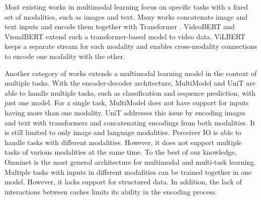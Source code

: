 \documentclass{article}
\begin{document}


Most existing works in multimodal learning focus on specific tasks with a fixed set of modalities, such as images and text. Many works concatenate image and text inputs and encode them together with Transformer \cite{chen2020uniter,li2020unicoder}. VideoBERT \cite{sun2019videobert} and VisualBERT \cite{li2019visualbert} extend such a transformer-based model to video data. ViLBERT \cite{lu2019vilbert} keeps a separate stream for each modality and enables cross-modality connections to encode one modality with the other. 

Another category of works extends a multimodal learning model in the context of multiple tasks. With the encoder-decoder architecture, MultiModel \cite{kaiser2017one} and UniT \cite{hu2021unit} are able to handle multiple tasks, such as classification and sequence prediction, with just one model. For a single task, MultiModel does not have support for inputs having more than one modality. UniT addresses this issue by encoding images and text with transformers and concatenating encodings from both modalities. It is still limited to only image and language modalities. Perceiver IO \cite{jaegle2021perceiver} is able to handle tasks with different modalities. However, it does not support multiple tasks of various modalities at the same time. To the best of our knowledge, Omninet \cite{pramanik2019omninet} is the most general architecture for multimodal and multi-task learning. Multiple tasks with inputs in different modalities can be trained together in one model. However, it lacks support for structured data. In addition, the lack of interactions between caches limits its ability in the encoding process.  %
\end{document}
